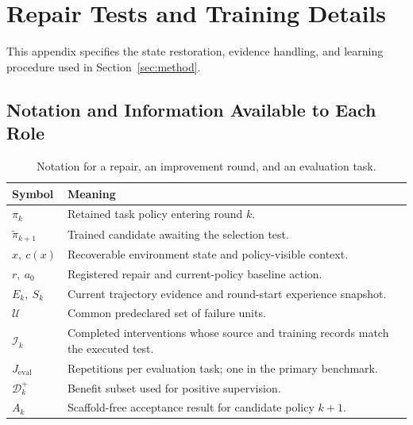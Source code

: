 \section{Repair Tests and Training Details}
\label{app:protocol}
This appendix specifies the state restoration, evidence handling, and learning
procedure used in Section~\ref{sec:method}.

\subsection{Notation and Information Available to Each Role}
\label{app:views}
\begin{table}[htbp]
\caption{Notation for a repair, an improvement round, and an evaluation task.}
\centering
\begin{tabularx}{\linewidth}{lX}
\toprule
Symbol & Meaning\\\midrule
$\pi_k$ & Retained task policy entering round $k$.\\
$\widetilde\pi_{k+1}$ & Trained candidate awaiting the selection test.\\
$x,\ c(x)$ & Recoverable environment state and policy-visible context.\\
$r,\ a_0$ & Registered repair and current-policy baseline action.\\
$E_k,\ S_k$ & Current trajectory evidence and round-start experience snapshot.\\
$\mathcal U$ & Common predeclared set of failure units.\\
$\mathcal I_k$ & Completed interventions whose source and training records match the executed test.\\
$J_{\mathrm{eval}}$ & Repetitions per evaluation task; one in the primary benchmark.\\
$\mathcal D_k^+$ & Benefit subset used for positive supervision.\\
$A_k$ & Scaffold-free acceptance result for candidate policy $k+1$.\\
\bottomrule
\end{tabularx}
\end{table}

